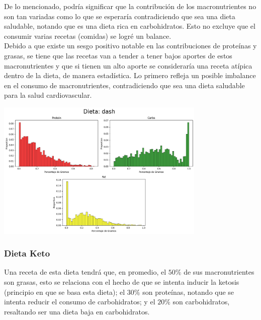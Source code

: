 \documentclass[12pt,a4paper]{article}
\begin{document}
            De lo mencionado, podría significar que la contribución de los macronutrientes 
            no son tan variadas como lo que se esperaría contradiciendo que sea una 
            dieta saludable, notando que es una dieta rica en carbohidratos. Esto no 
            excluye que el consumir varias recetas (comidas) se logré un balance.\\

            Debido a que existe un sesgo positivo notable en las contribuciones de 
            proteínas y grasas, se tiene que las recetas van a tender a tener bajos 
            aportes de estos macronutrientes y que si tienen un alto aporte se 
            consideraría una receta atípica dentro de la dieta, de manera estadística. 
            Lo primero refleja un posible imbalance en el consumo de macronutrientes, 
            contradiciendo que sea una dieta saludable para la salud cardiovascular.

            \begin{center}
                \includegraphics[width=0.75\textwidth]{Resources/2_03_plot_01.png}
            \end{center}

        \subsubsection{Dieta Keto}

            Una receta de esta dieta tendrá que, en promedio, el $50\%$ de 
            sus macronutrientes son grasas, esto se relaciona con el hecho de 
            que se intenta inducir la ketosis (principio en que se basa esta         
            dieta); el $30\%$ son proteínas, notando que se intenta reducir 
            el consumo de carbohidratos; y el $20\%$ son carbohidratos, 
            resaltando ser una dieta baja en carbohidratos.\\
\end{document}
